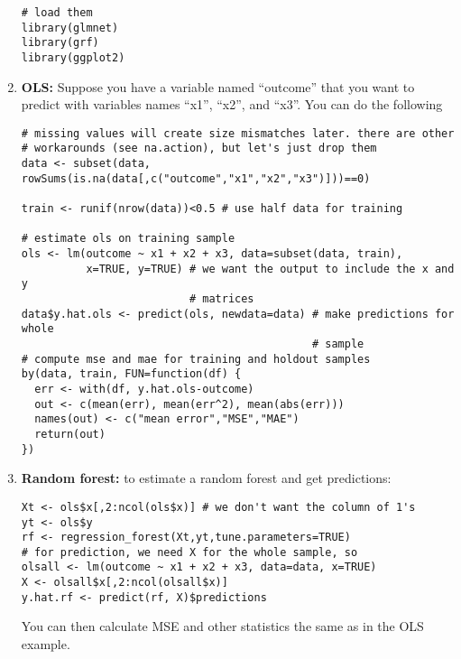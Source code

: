 \begin{problem}
\begin{enumerate}
\begin{lstlisting}
# load them
library(glmnet)
library(grf)
library(ggplot2)
\end{lstlisting}

  \item \textbf{OLS:} Suppose you have a variable named ``outcome''
    that you want to predict with variables names ``x1'', ``x2'', and
    ``x3''. You can do the following   
\begin{lstlisting}
# missing values will create size mismatches later. there are other
# workarounds (see na.action), but let's just drop them 
data <- subset(data, rowSums(is.na(data[,c("outcome","x1","x2","x3")]))==0)

train <- runif(nrow(data))<0.5 # use half data for training

# estimate ols on training sample
ols <- lm(outcome ~ x1 + x2 + x3, data=subset(data, train),
          x=TRUE, y=TRUE) # we want the output to include the x and y
                          # matrices
data$y.hat.ols <- predict(ols, newdata=data) # make predictions for whole
                                             # sample
# compute mse and mae for training and holdout samples
by(data, train, FUN=function(df) {
  err <- with(df, y.hat.ols-outcome)
  out <- c(mean(err), mean(err^2), mean(abs(err)))
  names(out) <- c("mean error","MSE","MAE")
  return(out)
})
\end{lstlisting}
  \item \textbf{Random forest:} to estimate a random forest and get predictions:
\begin{lstlisting}
Xt <- ols$x[,2:ncol(ols$x)] # we don't want the column of 1's 
yt <- ols$y
rf <- regression_forest(Xt,yt,tune.parameters=TRUE)
# for prediction, we need X for the whole sample, so
olsall <- lm(outcome ~ x1 + x2 + x3, data=data, x=TRUE) 
X <- olsall$x[,2:ncol(olsall$x)]
y.hat.rf <- predict(rf, X)$predictions
\end{lstlisting}
    You can then calculate MSE and other statistics the same as in the
    OLS example.
    

\end{enumerate}
\end{problem}
